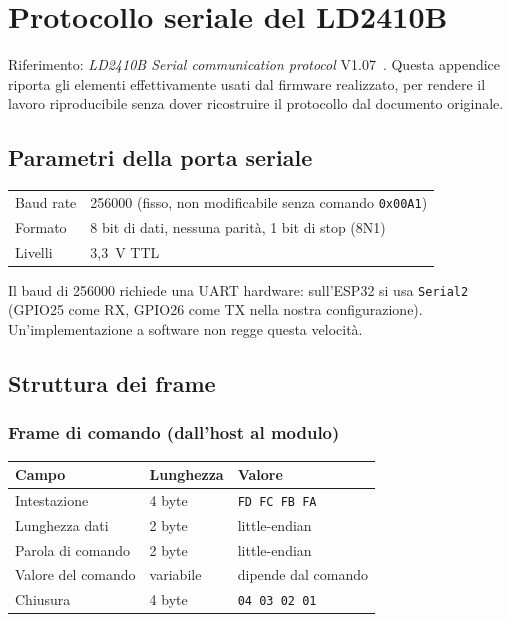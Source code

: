 \chapter{Protocollo seriale del LD2410B}
\label{app:protocollo}

Riferimento: \emph{LD2410B Serial communication protocol}
V1.07~\cite{hilinkProtoV107}. Questa appendice riporta gli elementi effettivamente
usati dal firmware realizzato, per rendere il lavoro riproducibile senza dover
ricostruire il protocollo dal documento originale.

\section{Parametri della porta seriale}

\begin{center}\small
\begin{tabular}{@{}ll@{}}
\toprule
Baud rate & 256000 (fisso, non modificabile senza comando \texttt{0x00A1}) \\
Formato & 8 bit di dati, nessuna parità, 1 bit di stop (8N1) \\
Livelli & 3,3~V TTL \\
\bottomrule
\end{tabular}
\end{center}

Il baud di 256000 richiede una UART hardware: sull'ESP32 si usa \texttt{Serial2}
(GPIO25 come RX, GPIO26 come TX nella nostra configurazione). Un'implementazione a
software non regge questa velocità.

\section{Struttura dei frame}

\subsection{Frame di comando (dall'host al modulo)}

\begin{center}\small
\begin{tabular}{@{}lll@{}}
\toprule
\textbf{Campo} & \textbf{Lunghezza} & \textbf{Valore} \\
\midrule
Intestazione & 4 byte & \texttt{FD FC FB FA} \\
Lunghezza dati & 2 byte & little-endian \\
Parola di comando & 2 byte & little-endian \\
Valore del comando & variabile & dipende dal comando \\
Chiusura & 4 byte & \texttt{04 03 02 01} \\
\bottomrule
\end{tabular}
\end{center}

